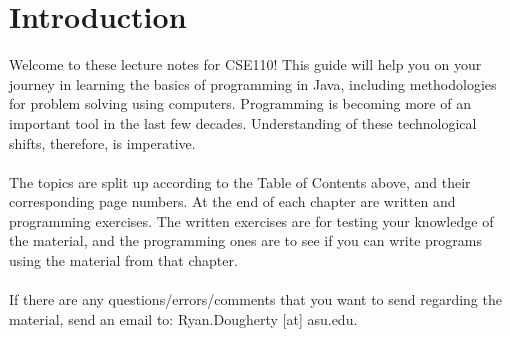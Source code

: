 %
\newpage
\tableofcontents
\newpage
%
\section{Introduction}
%
Welcome to these lecture notes for CSE110! This guide will help you on your journey in learning the basics of programming in Java, including methodologies for problem solving using computers. Programming is becoming more of an important tool in the last few decades. Understanding of these technological shifts, therefore, is imperative. 
\\ \\
The topics are split up according to the Table of Contents above, and their corresponding page numbers. At the end of each chapter are written and programming exercises. The written exercises are for testing your knowledge of the material, and the programming ones are to see if you can write programs using the material from that chapter. 
\\ \\
If there are any questions/errors/comments that you want to send regarding the material, send an email to: Ryan.Dougherty [at] asu.edu.